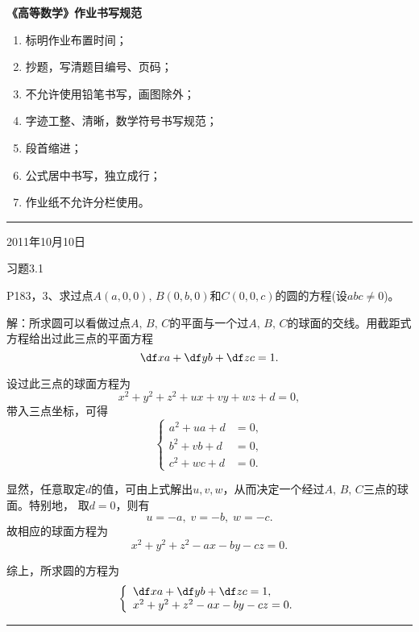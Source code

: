 \begin{center}
	{\large\bf 《高等数学》作业书写规范}
\end{center}
\bigskip

\begin{enumerate}
  \item 标明作业布置时间；
  \item 抄题，写清题目编号、页码；
  \item 不允许使用铅笔书写，画图除外；
  \item 字迹工整、清晰，数学符号书写规范；
  \item 段首缩进；
  \item 公式居中书写，独立成行；
  \item 作业纸不允许分栏使用。
\end{enumerate}

\linespread{1.2}

\bigskip
\hspace{-2em}{\bf 参考示范：}
\bigskip

\hrule
\bigskip

2011年10月10日

习题3.1

P183，3、求过点$A(a,0,0),\,B(0,b,0)$和$C(0,0,c)$的圆的方程(设$abc\ne 0$)。

解：所求圆可以看做过点$A,\,B,\,C$的平面与一个过$A,\,B,\,C$的球面的交线。用截距式方程给出过此三点的平面方程
$$\df xa+\df yb+\df zc =1.$$

设过此三点的球面方程为
$$x^2+y^2+z^2+ux+vy+wz+d=0,$$
带入三点坐标，可得
$$\left\{\begin{array}{cc}
	a^2+ua+d&=0,\\
	b^2+vb+d&=0,\\
	c^2+wc+d&=0.
\end{array}\right.$$

显然，任意取定$d$的值，可由上式解出$u,v,w$，从而决定一个经过$A,\,B,\,C$三点的球面。特别地，
取$d=0$，则有
$$u=-a,\;v=-b,\;w=-c.$$
故相应的球面方程为
$$x^2+y^2+z^2-ax-by-cz=0.$$

综上，所求圆的方程为
$$\left\{\begin{array}{l}
	\df xa+\df yb+\df zc =1,\\
	x^2+y^2+z^2-ax-by-cz=0.
\end{array}\right.$$
\bigskip
\hrule